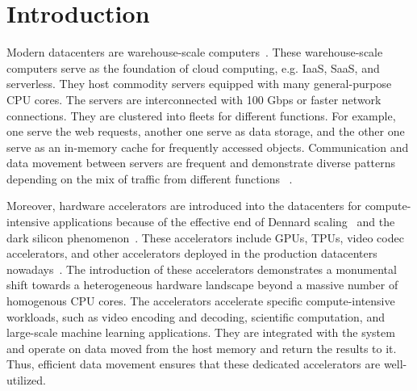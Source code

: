 \chapter{Introduction}

Modern datacenters are warehouse-scale computers~\cite{datacenter-as-a-computer:2013}.
%
These warehouse-scale computers serve as the foundation of cloud computing, e.g. IaaS, SaaS, and serverless.
%
They host commodity servers equipped with many general-purpose CPU cores.
%
The servers are interconnected with 100 Gbps or faster network connections.
%
They are clustered into fleets for different functions. For example, one serve the web requests, another one serve as data storage, and the other one serve as an in-memory cache for frequently accessed objects.
%
Communication and data movement between servers are frequent and demonstrate diverse patterns depending on the mix of traffic from different functions 
~\cite{nishtala_memcached_nsdi13, google-datacenter-isca15, facebook_datacenter:hpca:2018,azure_serverless_computing:2021}.

Moreover, hardware accelerators are introduced into the datacenters for compute-intensive applications because of the effective end of Dennard scaling~\cite{dennard_scaling} and the dark silicon phenomenon~\cite{dark_silicon_isca2011, dark_silicon:babak}.
%
These accelerators include GPUs, TPUs, video codec accelerators, and other accelerators deployed in the production datacenters nowadays~\cite{tpu:isca:2017, google-vcu:asplos:2021, google-datacenter-isca15, aws-trainium:2022,aws-inferentia:2019}.
%
The introduction of these accelerators demonstrates a monumental shift towards a heterogeneous hardware landscape beyond a massive number of homogenous CPU cores.  
%
The accelerators accelerate specific compute-intensive workloads, such as video encoding and decoding, scientific computation, and large-scale machine learning applications.
%
They are integrated with the system and operate on data moved from the host memory and return the results to it.
%
Thus, efficient data movement ensures that these dedicated accelerators are well-utilized.


